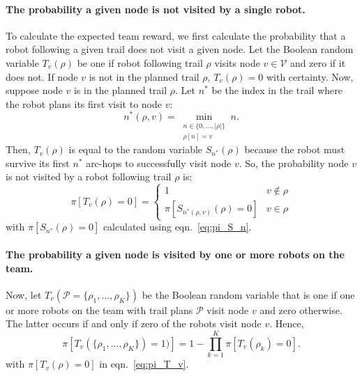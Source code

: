 \documentclass[11pt, oneside]{article}
\begin{document}
\paragraph{The probability a given node is not visited by a single robot.} 
To calculate the expected team reward, we first calculate the probability that a robot following a given trail does not visit a given node.
Let the Boolean random variable $T_v(\rho)$ be one if robot following trail $\rho$ visits node $v\in \mathcal{V}$ and zero if it does not.
If node $v$ is not in the planned trail $\rho$, $T_v(\rho)=0$ with certainty. 
Now, suppose node $v$ is in the planned trail $\rho$. Let $n^*$ be the index in the trail where the robot plans its first visit to node $v$:
\begin{equation}
n^*(\rho, v) = \min_{
	\substack{n \in \{0, ..., \lvert \rho \rvert\} \\ \rho[n] = v}
} n.
\end{equation}
Then, $T_v(\rho)$ is equal to the random variable $S_{n^*}(\rho)$ because the robot must survive its first $n^*$ arc-hops to successfully visit node $v$. 
So, the probability node $v$ is not visited by a robot following trail $\rho$ is:
\begin{equation}
	\pi[T_v(\rho) = 0] = 
	\begin{cases}
		1 & v\notin \rho\\
		 \pi [S_{n^*(\rho, v)}(\rho)=0 ] & v \in \rho
	\end{cases}
	 \label{eq:pi_T_v}
\end{equation}
with $\pi[S_{n^*}(\rho)=0]$ calculated using eqn.~\ref{eq:pi_S_n}.

\paragraph{The probability a given node is visited by one or more robots on the team.} 
Now, let $T_v(\mathcal{P}=\{\rho_1, ..., \rho_K\} )$ be the Boolean random variable that is one if one or more robots on the team with trail plans $\mathcal{P}$ visit node $v$ and zero otherwise.
The latter occurs if and only if zero of the robots visit node $v$. Hence,
\begin{equation}
	\pi [T_v(\{\rho_1, ..., \rho_K\} ) = 1)] = 
	1 - \prod_{k=1}^K \pi[T_v(\rho_k)=0].
	\label{eq:pi_T_v_all}
\end{equation} 
with $\pi[T_v(\rho) = 0]$ in eqn.~\ref{eq:pi_T_v}.
\end{document}
